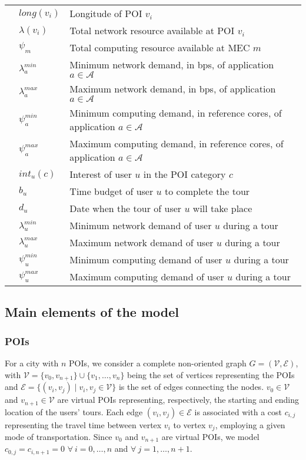 \begin{table}[htb]
\begin{tabular}{rlp{60mm}}
    & $long(v_{i})$ & Longitude of POI $v_i$ \\
    & $\lambda({v_{i}})$ & Total network resource available at POI $v_{i}$ \\
    & ${\psi}_{m}$ & Total computing resource available at MEC $m$ \\
    \hline
    {\multirow{7}{*}{\rotatebox[origin=r]{90}{Application input}}}
    & $\lambda_{a}^{min}$ & Minimum network demand, in bps, of application $a \in \mathcal{A}$ \\
    & $\lambda_{a}^{max}$ & Maximum network demand, in bps, of application $a \in \mathcal{A}$ \\
    & $\psi_{a}^{min}$ & Minimum computing demand, in reference cores, of application $a \in \mathcal{A}$ \\
    & $\psi_{a}^{max}$ & Maximum computing demand, in reference cores, of application $a \in \mathcal{A}$ \\
    \hline
    {\multirow{9}{*}{\rotatebox[origin=r]{90}{User input}}}
    & $int_u(c)$ & Interest of user $u$ in the POI category $c$ \\
    & $b_u$ & Time budget of user $u$ to complete the tour\\
    & $d_u$ & Date when the tour of user $u$ will take place \\
    & $\lambda_{u}^{min}$ & Minimum network demand of user $u$ during a tour \\
    & $\lambda_{u}^{max}$ & Maximum network demand of user $u$ during a tour \\
    & $\psi_{u}^{min}$ & Minimum computing demand of user $u$ during a tour \\ 
    & $\psi_{u}^{max}$ & Maximum computing demand of user $u$ during a tour \\
\hline
\end{tabular} 
\end{table}

\subsection{Main elements of the model}
\label{sec:model-1}

\subsubsection{\textbf{POIs}}
For a city with $n$ POIs, we consider a complete non-oriented graph $G = (\mathcal{V},\mathcal{E})$, with $\mathcal{V} = \{v_{0}, v_{n+1}\} \cup \{v_{1}, \dots, v_{n}\}$ being the set of vertices representing the POIs and $\mathcal{E} = \{(v_{i},v_{j}) \mid v_{i}, v_{j} \in \mathcal{V}\}$ is the set of edges connecting the nodes. $v_{0} \in \mathcal{V}$ and $v_{n+1} \in \mathcal{V}$ are virtual POIs representing, respectively, the starting and ending location of the users' tours. Each edge $(v_{i},v_{j}) \in \mathcal{E}$ is associated with a cost $c_{i,j}$ representing the travel time between vertex $v_{i}$ to vertex $v_{j}$, employing a given mode of transportation. Since $v_{0}$ and $v_{n+1}$ are virtual POIs, we model $c_{0,j}=c_{i,n+1}=0$ $\forall \ i=0,\dots,n$ and $\forall \ j=1,\dots,n+1$. 

